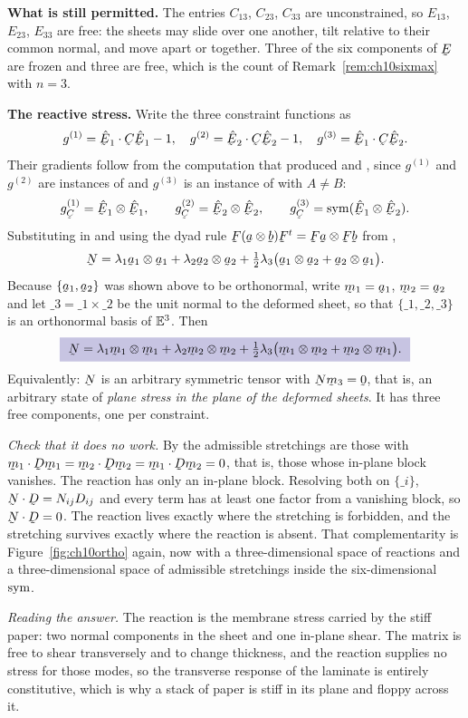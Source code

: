 \begin{solution}
\textbf{What is still permitted.} The entries $C_{13}$, $C_{23}$,
$C_{33}$ are unconstrained, so $E_{13}$, $E_{23}$, $E_{33}$ are free:
the sheets may slide over one another, tilt relative to their common
normal, and move apart or together. Three of the six components of $\bE$
are frozen and three are free, which is the count of
Remark~\ref{rem:ch10sixmax} with $n=3$.

\textbf{The reactive stress.} Write the three constraint functions as
\[
   g^{(1)}=\ip{\hbE_{1}}{\bC\hbE_{1}}-1,\quad
   g^{(2)}=\ip{\hbE_{2}}{\bC\hbE_{2}}-1,\quad
   g^{(3)}=\ip{\hbE_{1}}{\bC\hbE_{2}} .
\]
Their gradients follow from the computation that produced 
and , since $g^{(1)}$ and $g^{(2)}$ are instances of
 and $g^{(3)}$ is an instance of  with $A\neq B$:
\[
   g^{(1)}_{\bC}=\hbE_{1}\otimes\hbE_{1},\qquad
   g^{(2)}_{\bC}=\hbE_{2}\otimes\hbE_{2},\qquad
   g^{(3)}_{\bC}=\Sym(\hbE_{1}\otimes\hbE_{2}) .
\]
Substituting in  and using the dyad rule
$\bF(\ba\otimes\bb)\bF^{t}=\bF\ba\otimes\bF\bb$ from ,
\[
   \bN=\lambda_{1}\ba_{1}\otimes\ba_{1}+\lambda_{2}\ba_{2}\otimes\ba_{2}
      +\tfrac12\lambda_{3}\big(\ba_{1}\otimes\ba_{2}
      +\ba_{2}\otimes\ba_{1}\big).
\]
Because $\{\ba_{1},\ba_{2}\}$ was shown above to be orthonormal, write
$\bm_{1}=\ba_{1}$, $\bm_{2}=\ba_{2}$ and let $\bm_{3}=\bm_{1}\times
\bm_{2}$ be the unit normal to the deformed sheet, so that
$\{\bm_{1},\bm_{2},\bm_{3}\}$ is an orthonormal basis of $\mathbb{E}^{3}$. Then
\[
   \boxed{\ \bN=\lambda_{1}\bm_{1}\otimes\bm_{1}
   +\lambda_{2}\bm_{2}\otimes\bm_{2}
   +\tfrac12\lambda_{3}\big(\bm_{1}\otimes\bm_{2}
   +\bm_{2}\otimes\bm_{1}\big).\ }
\]
Equivalently: $\bN$ is an arbitrary symmetric tensor with
$\bN\bm_{3}=\bze$, that is, an arbitrary state of \emph{plane stress in
the plane of the deformed sheets}. It has three free components, one per
constraint.

\emph{Check that it does no work.} By  the admissible
stretchings are those with $\ip{\bm_{1}}{\bD\bm_{1}}
=\ip{\bm_{2}}{\bD\bm_{2}}=\ip{\bm_{1}}{\bD\bm_{2}}=0$, that is, those
whose in-plane block vanishes. The reaction has only an in-plane block.
Resolving both on $\{\bm_{i}\}$, $\bN\cdot\bD=N_{ij}D_{ij}$ and every
term has at least one factor from a vanishing block, so $\bN\cdot\bD=0$.
The reaction lives exactly where the stretching is forbidden, and the
stretching survives exactly where the reaction is absent. That
complementarity is Figure~\ref{fig:ch10ortho} again, now with a
three-dimensional space of reactions and a three-dimensional space of
admissible stretchings inside the six-dimensional $\operatorname{sym}$.

\emph{Reading the answer.} The reaction is the membrane stress carried by
the stiff paper: two normal components in the sheet and one in-plane
shear. The matrix is free to shear transversely and to change thickness,
and the reaction supplies no stress for those modes, so the transverse
response of the laminate is entirely constitutive, which is why a stack
of paper is stiff in its plane and floppy across it.
\end{solution}

